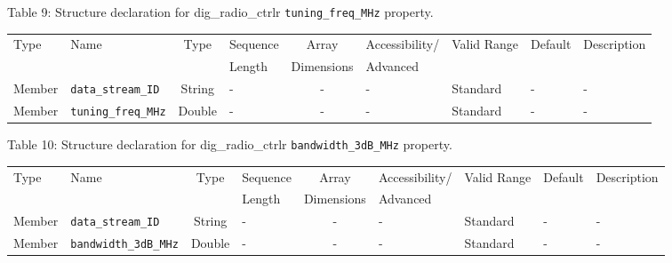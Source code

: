 \documentclass{article}
\def\comp{dig\_radio\_ctrlr}
\begin{document}
\begin{landscape}
	\noindent Table \hypertarget{tab9}{9}: Structure declaration for \comp{} \verb+tuning_freq_MHz+ property.
	\begin{scriptsize}
		\noindent\begin{longtable}{|p{1.8cm}|p{3.6cm}|c|p{4cm}|c|p{2cm}|p{1.7cm}|p{0.8cm}|p{4.69cm}|}
			\hline
			\rowcolor{blue}
			Type         & Name                                & Type & Sequence & Array      & Accessibility/ & Valid Range  & Default & Description                                                                                                                                                                                                                       \\
			\rowcolor{blue}
			             &                                     &      & Length   & Dimensions & Advanced       &              &         &                                                                                                                                                                                                                             \\
			\hline
			Member       & \verb+data_stream_ID+               & String& -       & -          & -              & Standard     & -       & - \\
			\hline
			Member       & \verb+tuning_freq_MHz+              & Double & -       & -          & -              & Standard & -       & - \\
			\hline
		\end{longtable}
	\end{scriptsize}

	\noindent Table \hypertarget{tab10}{10}: Structure declaration for \comp{} \verb+bandwidth_3dB_MHz+ property.
	\begin{scriptsize}
		\noindent\begin{longtable}{|p{1.8cm}|p{3.6cm}|c|p{4cm}|c|p{2cm}|p{1.7cm}|p{0.8cm}|p{4.69cm}|}
			\hline
			\rowcolor{blue}
			Type         & Name                                & Type & Sequence & Array      & Accessibility/ & Valid Range  & Default & Description                                                                                                                                                                                                                       \\
			\rowcolor{blue}
			             &                                     &      & Length   & Dimensions & Advanced       &              &         &                                                                                                                                                                                                                             \\
			\hline
			Member       & \verb+data_stream_ID+               & String& -       & -          & -              & Standard     & -       & - \\
			\hline
			Member       & \verb+bandwidth_3dB_MHz+            & Double & -       & -          & -              & Standard & -       & - \\
			\hline
		\end{longtable}
	\end{scriptsize}


\end{landscape}
\end{document}
